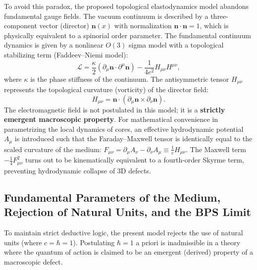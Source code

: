 \documentclass[11pt,a4paper]{article}
\begin{document}
To avoid this paradox, the proposed topological elastodynamics model abandons fundamental gauge fields. The vacuum continuum is described by a three-component vector (director) $\mathbf{n}(x)$ with normalization $\mathbf{n} \cdot \mathbf{n} = 1$, which is physically equivalent to a spinorial order parameter.
The fundamental continuum dynamics is given by a nonlinear $O(3)$ sigma model with a topological stabilizing term (Faddeev–Niemi model):
\begin{equation}
\mathcal{L} = \frac{\kappa}{2} (\partial_\mu \mathbf{n} \cdot \partial^\mu \mathbf{n}) - \frac{1}{4e^2} H_{\mu\nu} H^{\mu\nu},
\end{equation}
where $\kappa$ is the phase stiffness of the continuum. The antisymmetric tensor $H_{\mu\nu}$ represents the topological curvature (vorticity) of the director field:
\begin{equation}
H_{\mu\nu} = \mathbf{n} \cdot (\partial_\mu \mathbf{n} \times \partial_\nu \mathbf{n}).
\end{equation}
The electromagnetic field is not postulated in this model; it is a \textbf{strictly emergent macroscopic property}. For mathematical convenience in parametrizing the local dynamics of cores, an effective hydrodynamic potential $A_\mu$ is introduced such that the Faraday–Maxwell tensor is identically equal to the scaled curvature of the medium: $F_{\mu\nu} = \partial_\mu A_\nu - \partial_\nu A_\mu \equiv \frac{1}{e} H_{\mu\nu}$. The Maxwell term $-\frac{1}{4}F_{\mu\nu}^2$ turns out to be kinematically equivalent to a fourth-order Skyrme term, preventing hydrodynamic collapse of 3D defects.

\subsection{Fundamental Parameters of the Medium, Rejection of Natural Units, and the BPS Limit}
To maintain strict deductive logic, the present model rejects the use of natural units (where $c = \hbar = 1$). Postulating $\hbar=1$ a priori is inadmissible in a theory where the quantum of action is claimed to be an emergent (derived) property of a macroscopic defect.
\end{document}
